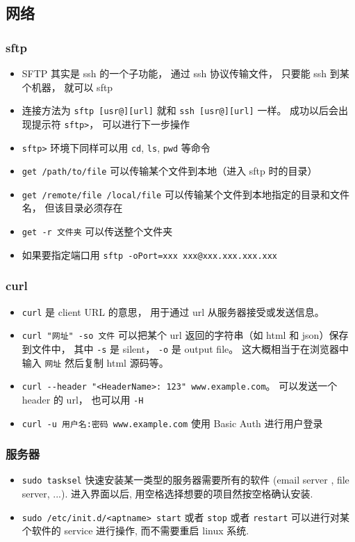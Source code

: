 \subsection{网络}
\subsubsection{sftp}
\begin{itemize}
\item SFTP 其实是 ssh 的一个子功能， 通过 ssh 协议传输文件， 只要能 ssh 到某个机器， 就可以 sftp
\item 连接方法为 \verb`sftp [usr@][url]` 就和 \verb`ssh [usr@][url]` 一样。 成功以后会出现提示符 \verb`sftp>`， 可以进行下一步操作
\item \verb`sftp>` 环境下同样可以用 \verb`cd`, \verb`ls`, \verb`pwd` 等命令
\item \verb`get /path/to/file` 可以传输某个文件到本地（进入 sftp 时的目录）
\item \verb`get /remote/file /local/file` 可以传输某个文件到本地指定的目录和文件名， 但该目录必须存在
\item \verb`get -r 文件夹` 可以传送整个文件夹
\item 如果要指定端口用 \verb`sftp -oPort=xxx xxx@xxx.xxx.xxx.xxx`
\end{itemize}

\subsubsection{curl}
\begin{itemize}
\item \verb`curl` 是 client URL 的意思， 用于通过 url 从服务器接受或发送信息。
\item \verb`curl "网址" -so 文件` 可以把某个 url 返回的字符串（如 html 和 json）保存到文件中， 其中 \verb`-s` 是 silent， \verb`-o` 是 output file。 这大概相当于在浏览器中输入 \verb`网址` 然后复制 html 源码等。
\item \verb`curl --header "<HeaderName>: 123" www.example.com`。 可以发送一个 header 的 url， 也可以用 \verb`-H`
\item \verb`curl -u 用户名:密码 www.example.com` 使用 Basic Auth 进行用户登录
\end{itemize}

\subsubsection{服务器}
\begin{itemize}
\item \verb`sudo tasksel` 快速安装某一类型的服务器需要所有的软件 (email server , file server, ...). 进入界面以后, 用空格选择想要的项目然按空格确认安装.
\item \verb`sudo /etc/init.d/<aptname> start` 或者 \verb`stop` 或者 \verb`restart` 可以进行对某个软件的 service 进行操作, 而不需要重启 linux 系统.
\end{itemize}


